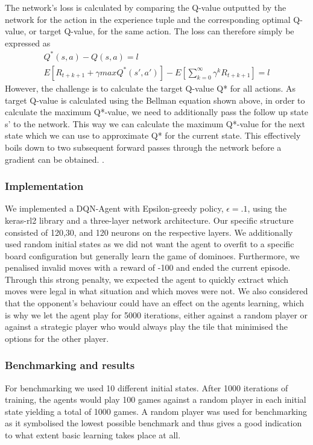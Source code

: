 \documentclass[12pt,a4paper]{article}
\begin{document}
The network’s loss is calculated by comparing the Q-value outputted by the network for the action in the experience tuple  and the corresponding optimal Q-value, or target Q-value, for the same action. The loss can therefore simply be expressed as
$$\begin{aligned}
Q^*(s,a) - Q(s,a) = l\\
 E\left[  R_{t+k+1} +  \gamma max Q^*(s',a') \right] - E\left[  \sum_{k=0}^{\infty}  \gamma^k R_{t+k+1} \right] = l
 \end{aligned}$$
However, the challenge is to calculate the target Q-value Q* for all actions. As target Q-value is calculated using the Bellman equation shown above, in order to calculate the maximum Q*-value, we need to additionally pass the follow up state s’ to the network. This way we can calculate the maximum Q*-value for the next state which we can use to approximate Q* for the current state. This effectively boils down to two subsequent forward passes through the network before a gradient can be obtained. 
 \citep{russell_artificial_2010}.


\subsubsection{Implementation}
We implemented a DQN-Agent with Epsilon-greedy policy, $\epsilon = .1$, using the keras-rl2 library and a three-layer network architecture. Our specific structure consisted of 120,30, and 120 neurons on the respective layers. We additionally used random initial states as we did not want the agent to overfit to a specific board configuration but generally learn the game of dominoes. Furthermore, we penalised invalid moves with a reward of -100 and ended the current episode. Through this strong penalty, we expected the agent to quickly extract which moves were legal in what situation and which moves were not. We also considered that the opponent’s behaviour could have an effect on the agents learning, which is why we let the agent play for 5000 iterations, either against a random player or against a strategic player who would always play the tile that minimised the options for the other player.

\subsubsection{Benchmarking and results}
For benchmarking we used 10 different initial states. After 1000 iterations of training, the agents would play 100 games against a random player in each initial state yielding a total of 1000 games. A random player was used for benchmarking as it symbolised the lowest possible benchmark and thus gives a good indication to what extent basic learning takes place at all.
\end{document}

